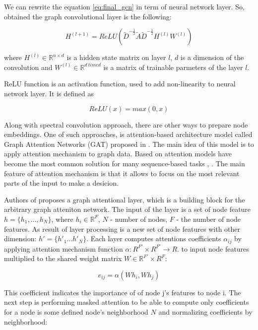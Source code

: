 We can rewrite the equation \ref{eq:final_gcn} in term of neural network layer. So, obtained the graph convolutional layer 
is the following:

\begin{equation}
    H^{(l+1)} = ReLU(\tilde{D}^{-\frac{1}{2}}\tilde{A}\tilde{D}^{-\frac{1}{2}}H^{(l)}W^{(l)})
    \label{eq:final_gcn_nn}
\end{equation}

where $H^{(l)} \in \mathbb{R}^{n \times d}$ is a hidden state matrix on layer $l$, $d$ is a dimension
of the convolution and $W^{(l)} \in \mathbb{R}^{d \ time d}$ is a matrix of trainable parmeters of the layer $l$.

ReLU function is an activation function, used to add non-linearity to neural network layer. It is defined as

\begin{equation}
    ReLU(x) = max(0,x)
    \label{eq:relu}
\end{equation}


Along with spectral convolution approach, there are other ways to prepare node embeddings. One of such approaches, is 
attention-based architecture model called Graph Attention Networks (GAT) proposed in \cite{GAT}.
The main idea of this model is to apply attention mechanism to graph data. Based on attention models have become 
the most common solution for many sequence-based tasks \cite{GATintro1}, \cite{GATintro2}.
The main feature of attention mechanism is that it allows to focus on the most relevant parts of the input 
to make a desicion.

Authors of \cite{GAT} proposes a graph attentional layer, which is a building block for the arbitrary graph atteniton network.
The input of the layer is a set of node feature $ h=\{ h_1,\dots , h_N \}$, where $h_i \in \mathbb{R}^F$, $N$ - number of nodes, $F$ - the number
of node features. As result of layer processing is a new set of node features with other dimension: $h' = \{ h'_1 \dots h'_N \}$.
Each layer computes attentions coefficients $\alpha_{ij}$ by applying attention mechanism function $\alpha : R^{F'} \times R^{F'} \rightarrow R$.
to input node features multiplied to the shared weight matrix $W \in \mathbb{R}^{F'} \times R^{F}$:

\begin{equation}
    e_{ij} = \alpha(Wh_i, Wh_j)
    \label{eq:att_coeff}
\end{equation}

This coefficient indicates the importance of of node j's features to node i. The next step is performing masked attention to 
be able to compute only coefficients for a node is some defined node's neighborhood $N$ and normalizing coefficients by neighborhood:

